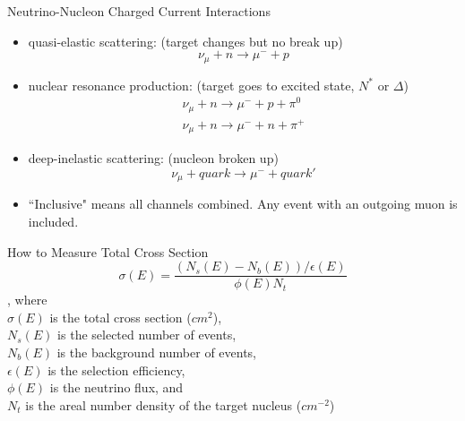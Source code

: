 \documentclass{beamer}
\begin{document}
\begin{frame}{Neutrino-Nucleon Charged Current Interactions}
\begin{itemize}
  \item quasi-elastic scattering: (target changes but no break up)
  \begin{equation*}
  \nu_\mu+n\rightarrow \mu^- +p
  \end{equation*}
  \item nuclear resonance production: (target goes to excited state, $N^*$ or $\Delta$)
  \begin{eqnarray*}
  \nu_\mu+n\rightarrow \mu^- +p+\pi^0\\
  \nu_\mu+n\rightarrow \mu^- +n+\pi^+
  \end{eqnarray*}
  \item deep-inelastic scattering: (nucleon broken up)
  \begin{equation*}
  \nu_\mu+quark\rightarrow \mu^- +quark'
  \end{equation*}
  \item ``Inclusive" means all channels combined. Any event with an outgoing muon is included.
\end{itemize}
\end{frame}

\begin{frame}{How to Measure Total Cross Section}
\begin{equation*}
\sigma(E)=\frac{\left(N_s(E)-N_b(E)\right)/\epsilon(E)}{\phi(E)N_t}
\end{equation*},
where\\
$\sigma(E)$ is the total cross section ($cm^2$),\\
$N_s(E)$ is the selected number of events,\\
$N_b(E)$ is the background number of events,\\
$\epsilon(E)$ is the selection efficiency,\\
$\phi(E)$ is the neutrino flux, and\\
$N_t$ is the areal number density of the target nucleus ($cm^{-2}$)
\end{frame}
\end{document}
